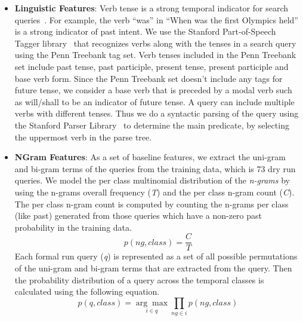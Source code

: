 \documentclass{sig-alternate}
\begin{document}
\begin{itemize}
In the dry run queries only 16 out of 100 contained time expressions that can be used to estimate the time distance, this reflects how rare it is to find explicit or implicit temporal expressions in a search query. Thus in order to obtain more candidate temporal expressions for the formal and dry run queries, we used the freely accessible GTE\footnote{http://www.ccc.ipt.pt/~ricardo/software.html} web service detailed in \cite{gte}. Given a query, the GTE web service returns a set of candidate years extracted from the \textit{top 50 web snippets} returned by the Bing Search API.  
\item\textbf{Linguistic Features}:
Verb tense is a strong temporal indicator for search queries~\cite{tuta}. For example, the verb ``was'' in ``When was the first Olympics held'' is a strong indicator of past intent. We use the Stanford Part-of-Speech Tagger library~\cite{postagger} that recognizes verbs along with the tenses in a search query using the Penn Treebank tag set. Verb tenses included in the Penn Treebank set include past tense, past participle, present tense, present participle and base verb form. Since the Penn Treebank set doesn't include any tags for future tense, we consider a base verb that is preceded by a modal verb such as will/shall to be an indicator of future tense. A query can include multiple verbs with different tenses. Thus we do a syntactic parsing of the query using the Stanford Parser Library~\cite{parser} to determine the main predicate, by selecting the uppermost verb in the parse tree. 
\item\textbf{NGram Features}:
As a set of baseline features, we extract the uni-gram and bi-gram terms of the queries from the training data, which is 73 dry run queries. We model the per class multinomial distribution of the \textit{n-grams} by using the n-grams overall frequency (\textit{T}) and the per class n-gram count (\textit{C}). The per class n-gram count is computed by counting the n-grams per class (like past) generated from those queries which have a non-zero past probability in the training data.
\begin{equation}\label{eq:1}
p(ng, class) = \frac{C}{T}
\end{equation}
Each formal run query (\textit{q}) is represented as a set of all possible permutations of the uni-gram and bi-gram terms that are extracted from the query. Then the probability distribution of a query across the temporal classes is calculated using the following equation.
\begin{equation}\label{eq:2}
p(q,class) =\underset{i\in q}{\arg\max}\prod_{ng \in i}p(ng, class)
\end{equation}
\end{itemize}
\end{document}
